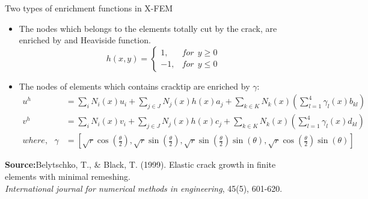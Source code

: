 \documentclass{beamer}
\begin{document}
\begin{frame}[t,fragile]{Two types of enrichment functions in X-FEM}
    \vspace{-.3cm}
     \footnotesize
    \begin{itemize}
        \item The nodes which belongs to the elements totally cut by the crack, are enriched by and Heaviside function.
    $$h(x,y)=\begin{cases}1,&       for ~ ~ y\ge 0\\ -1,&       for~ ~ y\le 0\end{cases}$$
\item The nodes of elements which contains cracktip are enriched by $\gamma$:
     \footnotesize
    \begin{align*}
    u^h&=\sum_i N_i(x)u_i+\sum_{j\in J} N_j(x) h(x)a_j+\sum_{k\in K} N_k(x)\left( \sum_{l=1}^{4}\gamma_l(x)b_{kl} \right) \\
    v^h&=\sum_i N_i(x)v_i+\sum_{j\in J} N_j(x) h(x)c_j+\sum_{k\in K} N_k(x)\left( \sum_{l=1}^{4}\gamma_l(x)d_{kl} \right) \\ 
    where,\ \ \ \gamma&=\left[ \sqrt{r}\cos \left( \frac{\theta}{2} \right), \sqrt{r}\sin\left( \frac{\theta}{2} \right),\sqrt{r}\sin\left( \frac{\theta}{2} \right)\sin(\theta),\sqrt{r}\cos\left( \frac{\theta}{2} \right)\sin(\theta)\right] 
\end{align*}
\end{itemize}
\tiny
\hspace{10pt}
\textbf{Source:}Belytschko, T., \& Black, T. (1999). Elastic crack growth in finite elements with minimal remeshing. \\
\vspace{-7pt}
\hspace{10pt}
\emph{International journal for numerical methods in engineering}, 45(5), 601-620.
\end{frame}
\end{document}

